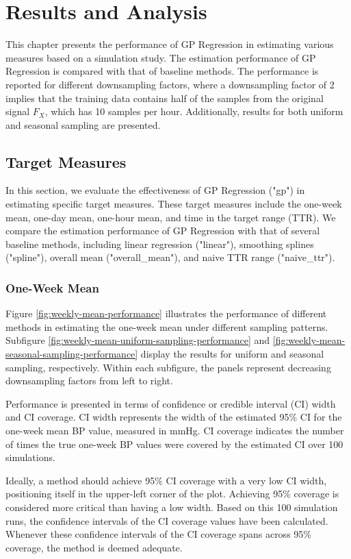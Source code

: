 \chapter{Results and Analysis}\label{ch:results}

This chapter presents the performance of GP Regression in estimating various
measures based on a simulation study.
The estimation performance of GP Regression is compared with that of baseline methods.
The performance is reported for different downsampling factors, where a downsampling
factor of 2 implies that the training data contains half of the samples from the
original signal $F_X$, which has 10 samples per hour.
Additionally, results for both uniform and seasonal sampling are presented.

\section{Target Measures}

In this section, we evaluate the effectiveness of GP Regression ("gp") in
estimating specific target measures. These target measures include the one-week mean,
one-day mean, one-hour mean, and time in the target range (TTR).
We compare the estimation performance of GP Regression with that of several baseline methods,
including linear regression ("linear"), smoothing splines ("spline"), overall mean
("overall\_mean"), and naive TTR range ("naive\_ttr").

\subsection{One-Week Mean}

Figure \ref{fig:weekly-mean-performance} illustrates the performance of different
methods in estimating the one-week mean under different sampling patterns.
Subfigure \ref{fig:weekly-mean-uniform-sampling-performance} and
\ref{fig:weekly-mean-seasonal-sampling-performance} display the results
for uniform and seasonal sampling, respectively. Within each subfigure, the panels
represent decreasing downsampling factors from left to right.

Performance is presented in terms of confidence or credible interval (CI) width and CI coverage.
CI width represents the width of the estimated 95\% CI for the one-week mean BP value,
measured in mmHg. CI coverage indicates the number of times the true one-week BP
values were covered by the estimated CI over 100 simulations.

Ideally, a method should achieve 95\% CI coverage with a very low CI width,
positioning itself in the upper-left corner of the plot. Achieving 95\% coverage
is considered more critical than having a low width.
Based on this 100 simulation runs, the confidence intervals
of the CI coverage values have been calculated.
Whenever these confidence intervals of the CI coverage
spans across 95\% coverage, the method is deemed adequate.


